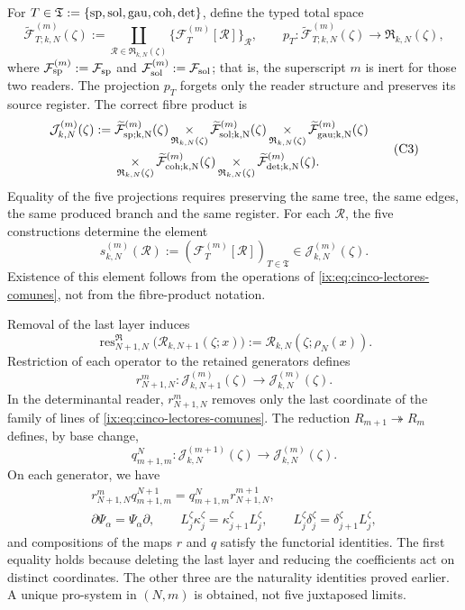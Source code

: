For
\(T\in\mathfrak T:=\{{\rm sp},{\rm sol},{\rm gau},{\rm coh},{\rm det}\}\),
define the typed total space
\[
 \widetilde{\mathcal F}_{T;k,N}^{(m)}(\zeta)
 :=\coprod_{\mathscr R\in\mathfrak R_{k,N}(\zeta)}
   \{\mathcal F_T^{(m)}[\mathscr R]\}_{\mathscr R},
 \qquad
 p_T:\widetilde{\mathcal F}_{T;k,N}^{(m)}(\zeta)
      \longrightarrow\mathfrak R_{k,N}(\zeta),
\]
where
\(\mathcal F_{\rm sp}^{(m)}:=\mathcal F_{\rm sp}\) and
\(\mathcal F_{\rm sol}^{(m)}:=\mathcal F_{\rm sol}\); that is, the
superscript \(m\) is inert for those two readers.
The projection \(p_T\) forgets only the reader structure and preserves
its source register. The correct fibre product is
\[
\begin{aligned}
 \mathcal J_{k,N}^{(m)}(\zeta):={}&
 \widetilde{\mathcal F}_{\rm sp;k,N}^{(m)}(\zeta)
 \mathop{\times}_{\mathfrak R_{k,N}(\zeta)}
 \widetilde{\mathcal F}_{\rm sol;k,N}^{(m)}(\zeta)
 \mathop{\times}_{\mathfrak R_{k,N}(\zeta)}
 \widetilde{\mathcal F}_{\rm gau;k,N}^{(m)}(\zeta)\\
 &\mathop{\times}_{\mathfrak R_{k,N}(\zeta)}
 \widetilde{\mathcal F}_{\rm coh;k,N}^{(m)}(\zeta)
 \mathop{\times}_{\mathfrak R_{k,N}(\zeta)}
 \widetilde{\mathcal F}_{\rm det;k,N}^{(m)}(\zeta).
\end{aligned}
\tag{C3}
\label{ix:eq:constructor-correlativo}
\]
Equality of the five projections requires preserving the same tree, the
same edges, the same produced branch and the same register. For each
\(\mathscr R\), the five constructions determine the element
\[
 s_{k,N}^{(m)}(\mathscr R)
 :=(\mathcal F_T^{(m)}[\mathscr R])_{T\in\mathfrak T}
 \in\mathcal J_{k,N}^{(m)}(\zeta).
\]
Existence of this element follows from the operations of
\eqref{ix:eq:cinco-lectores-comunes}, not from the
fibre-product notation.

Removal of the last layer induces
\[
 \operatorname{res}^{\mathfrak R}_{N+1,N}
 \bigl(\mathscr R_{k,N+1}(\zeta;x)\bigr)
 :=\mathscr R_{k,N}(\zeta;\rho_N(x)).
\]
Restriction of each operator to the retained generators defines
\[
 r^m_{N+1,N}:\mathcal J_{k,N+1}^{(m)}(\zeta)
 \longrightarrow\mathcal J_{k,N}^{(m)}(\zeta).
\]
In the determinantal reader, \(r^m_{N+1,N}\) removes only the last
coordinate of the family of lines of
\eqref{ix:eq:cinco-lectores-comunes}. The reduction
\(R_{m+1}\twoheadrightarrow R_m\) defines, by base change,
\[
 q^N_{m+1,m}:\mathcal J_{k,N}^{(m+1)}(\zeta)
 \longrightarrow\mathcal J_{k,N}^{(m)}(\zeta).
\]
On each generator, we have
\[
\begin{gathered}
 r^m_{N+1,N}q^{N+1}_{m+1,m}
 =q^N_{m+1,m}r^{m+1}_{N+1,N},\\
 \partial\Psi_\alpha=\Psi_\alpha\partial,
 \qquad L_j^\zeta\kappa_j^\zeta
       =\kappa_{j+1}^\zeta L_j^\zeta,
 \qquad L_j^\zeta\delta_j^\zeta
       =\delta_{j+1}^\zeta L_j^\zeta,
\end{gathered}
\tag{C4}
\label{ix:eq:naturalidad-D}
\]
and compositions of the maps \(r\) and \(q\) satisfy the functorial
identities. The first equality holds because deleting the last layer and
reducing the coefficients act on distinct coordinates. The other three
are the naturality identities proved earlier. A unique
pro-system in \((N,m)\) is obtained, not five juxtaposed limits.

